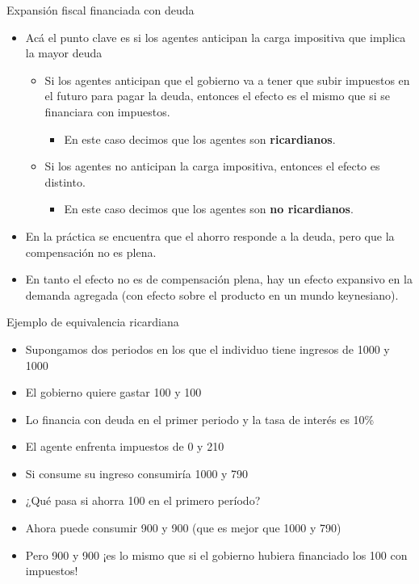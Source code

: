 \documentclass{beamer}
\begin{document}
\begin{frame}{Expansión fiscal financiada con deuda}
   \begin{itemize}
        \item Acá el punto clave es si los agentes anticipan la carga impositiva que implica la mayor deuda
        \begin{itemize}
            \item Si los agentes anticipan que el gobierno va a tener que subir impuestos en el futuro para pagar la deuda, entonces el efecto es el mismo que si se financiara con impuestos.
            \begin{itemize}
                \item En este caso decimos que los agentes son \textbf{ricardianos}.
            \end{itemize}
            \item Si los agentes no anticipan la carga impositiva, entonces el efecto es distinto.
            \begin{itemize}
                \item En este caso decimos que los agentes son \textbf{no ricardianos}.
            \end{itemize}
        \end{itemize}
        \item En la práctica se encuentra que el ahorro responde a la deuda, pero que la compensación no es plena.
        \item En tanto el efecto no es de compensación plena, hay un efecto expansivo en la demanda agregada (con efecto sobre el producto en un mundo keynesiano).
    \end{itemize}
\end{frame}

\begin{frame}{Ejemplo de equivalencia ricardiana}
    \begin{itemize}
        \item Supongamos dos periodos en los que el individuo tiene ingresos de 1000 y 1000
        \item El gobierno quiere gastar 100 y 100 
        \item Lo financia con deuda en el primer periodo y la tasa de interés es 10\%
        \item El agente enfrenta impuestos de 0 y 210
        \item Si consume su ingreso consumiría 1000 y 790 
        \item ¿Qué pasa si ahorra 100 en el primero período?
        \item Ahora puede consumir 900 y 900 (que es mejor que 1000 y 790)
        \item Pero 900 y 900 ¡es lo mismo que si el gobierno hubiera financiado los 100 con impuestos! 
    \end{itemize}
\end{frame}
\end{document}

